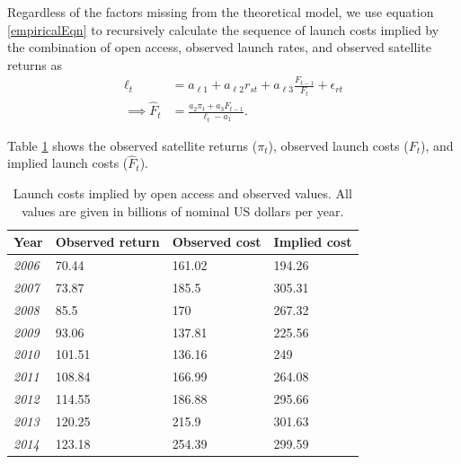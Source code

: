 \documentclass[12pt]{article}
\begin{document}
Regardless of the factors missing from the theoretical model, we use equation \ref{empiricalEqn} to recursively calculate the sequence of launch costs implied by the combination of open access, observed launch rates, and observed satellite returns as
\begin{align}
\ell_{t} &= a_{\ell 1} + a_{\ell 2} r_{st} + a_{\ell 3} \frac{F_{t-1}}{F_t} + \epsilon_{r t} \nonumber \\
\implies \hat{F}_t &=	\frac{a_2 \pi_t + a_3 F_{t-1}}{\ell_t - a_1}.
\end{align}

Table \ref{launchCosts} shows the observed satellite returns ($\pi_t$), observed launch costs ($F_t$), and implied launch costs ($\hat{F}_t$).

\begin{table}[]
	\centering
	\begin{tabular}{|l|l|l|l|}
		\hline
		Year & \multicolumn{1}{l|}{Observed return} & \multicolumn{1}{l|}{Observed cost} & \multicolumn{1}{l|}{Implied cost} \\ \hline
		\textit{2006} & 70.44                                & 161.02                             & 194.26                            \\ \hline
		\textit{2007} & 73.87                                & 185.5                              & 305.31                            \\ \hline
		\textit{2008} & 85.5                                 & 170                                & 267.32                            \\ \hline
		\textit{2009} & 93.06                                & 137.81                             & 225.56                            \\ \hline
		\textit{2010} & 101.51                               & 136.16                             & 249                               \\ \hline
		\textit{2011} & 108.84                               & 166.99                             & 264.08                            \\ \hline
		\textit{2012} & 114.55                               & 186.88                             & 295.66                            \\ \hline
		\textit{2013} & 120.25                               & 215.9                              & 301.63                            \\ \hline
		\textit{2014} & 123.18                               & 254.39                             & 299.59                            \\ \hline
	\end{tabular}
	\caption{Launch costs implied by open access and observed values. All values are given in billions of nominal US dollars per year.}
	\label{launchCosts}
\end{table}
\end{document}
